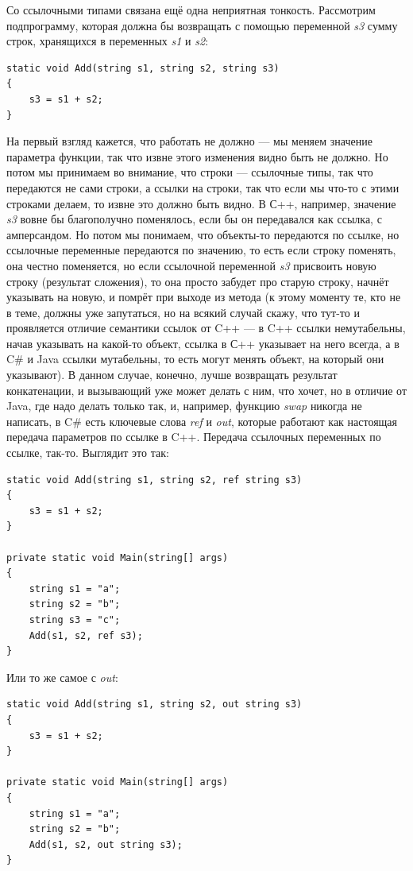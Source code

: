 \documentclass{../../text-style}
\begin{document}
Со ссылочными типами связана ещё одна неприятная тонкость. Рассмотрим подпрограмму, которая должна бы возвращать с помощью переменной \textit{s3} сумму строк, хранящихся в переменных \textit{s1} и \textit{s2}:

\begin{verbatim}
static void Add(string s1, string s2, string s3)
{
    s3 = s1 + s2;
}
\end{verbatim}

На первый взгляд кажется, что работать не должно --- мы меняем значение параметра функции, так что извне этого изменения видно быть не должно. Но потом мы принимаем во внимание, что строки --- ссылочные типы, так что передаются не сами строки, а ссылки на строки, так что если мы что-то с этими строками делаем, то извне это должно быть видно. В С++, например, значение \textit{s3} вовне бы благополучно поменялось, если бы он передавался как ссылка, с амперсандом. Но потом мы понимаем, что объекты-то передаются по ссылке, но ссылочные переменные передаются по значению, то есть если строку поменять, она честно поменяется, но если ссылочной переменной \textit{s3} присвоить новую строку (результат сложения), то она просто забудет про старую строку, начнёт указывать на новую, и помрёт при выходе из метода (к этому моменту те, кто не в теме, должны уже запутаться, но на всякий случай скажу, что тут-то и проявляется отличие семантики ссылок от C++ --- в C++ ссылки немутабельны, начав указывать на какой-то объект, ссылка в С++ указывает на него всегда, а в C\# и Java ссылки мутабельны, то есть могут менять объект, на который они указывают). В данном случае, конечно, лучше возвращать результат конкатенации, и вызывающий уже может делать с ним, что хочет, но в отличие от Java, где надо делать только так, и, например, функцию \textit{swap} никогда не написать, в C\# есть ключевые слова \textit{ref} и \textit{out}, которые работают как настоящая передача параметров по ссылке в C++. Передача ссылочных переменных по ссылке, так-то. Выглядит это так:

\begin{verbatim}
static void Add(string s1, string s2, ref string s3)
{
    s3 = s1 + s2;
}

private static void Main(string[] args)
{
    string s1 = "a";
    string s2 = "b";
    string s3 = "c";
    Add(s1, s2, ref s3);
}
\end{verbatim}

Или то же самое с \textit{out}:

\begin{verbatim}
static void Add(string s1, string s2, out string s3)
{
    s3 = s1 + s2;
}

private static void Main(string[] args)
{
    string s1 = "a";
    string s2 = "b";
    Add(s1, s2, out string s3);
}
\end{verbatim}
\end{document}
